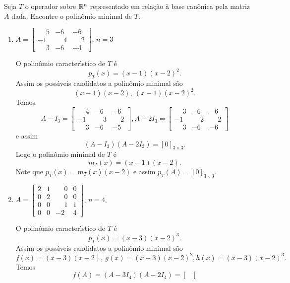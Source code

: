 \begin{exemplo}
	Seja $T$ o operador sobre $\mathbb{R}^n$ representado em rela\c{c}\~ao \`a base can\^onica pela matriz $A$ dada. Encontre o polin\^omio minimal de $T$.
	\begin{enumerate}[label={\arabic*})]
		\item $A = \begin{bmatrix}
			\phantom{-}5 & -6 & -6\\
			-1 & \phantom{-}4 & \phantom{-}2\\
			\phantom{-}3 & -6 & -4
		\end{bmatrix}$, $n = 3$
		\begin{solucao}
			O polin\^omio caracter{\'\i}stico de $T$ \'e
			\[
				p_T(x) = (x - 1)(x - 2)^2.
			\]
			Assim os poss{\'\i}veis candidatos a polin\^omio minimal s\~ao
			\[
				(x - 1)(x - 2), \ (x -1)(x - 2)^2.
			\]
			Temos
			\[
				A - I_3 = \begin{bmatrix}
					\phantom{-}4 & -6 & -6\\
					-1 & \phantom{-}3 & \phantom{-}2\\
					\phantom{-}3 & -6 & -5
				\end{bmatrix},
				A - 2I_3 = \begin{bmatrix}
					\phantom{-}3 & -6 & -6\\
					-1 & \phantom{-}2 & \phantom{-}2\\
					\phantom{-}3 & -6 & -6
				\end{bmatrix}
			\]
			e assim
			\[
				(A - I_3)(A - 2I_3) = [0]_{3 \times 3}.
			\]
			Logo o polin\^omio minimal de $T$ \'e
			\[
				m_T(x) = (x - 1)(x - 2).
			\]
			Note que $p_T(x) = m_T(x)(x - 2)$ e assim $p_T(A) = [0]_{3 \times 3}$.
		\end{solucao}
		\item $A = \begin{bmatrix}
			2 & 1 & \phantom{-}0 & 0\\
			0 & 2 & \phantom{-}0 & 0\\
			0 & 0 & \phantom{-}1 & 1\\
			0 & 0 & -2 & 4
		\end{bmatrix}$, $n = 4$.
		\begin{solucao}
			O polin\^omio caracter{\'\i}stico de $T$ \'e
			\[
				p_T(x) = (x - 3)(x - 2)^3.
			\]
			Assim os poss{\'\i}veis candidatos a polin\^omio minimal s\~ao
			\[
				f(x) = (x - 3)(x - 2), \ g(x) = (x -3)(x - 2)^2, h(x) = (x - 3)(x - 2)^3.
			\]
			Temos
			\[
				f(A) = (A - 3I_4)(A - 2I_4) = \begin{bmatrix}

\end{bmatrix}\]
\end{solucao}
\end{enumerate}
\end{exemplo}
